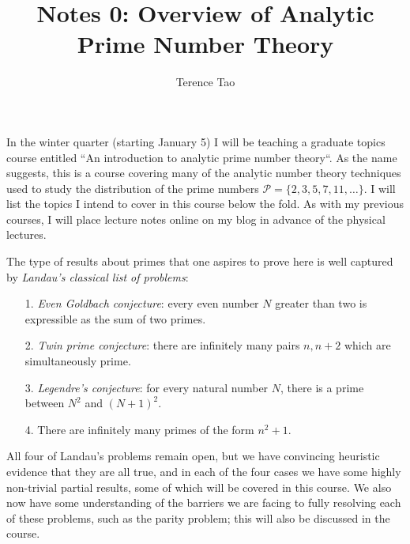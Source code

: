 \documentclass[10pt,reqno]{amsart}
\title{Notes 0: Overview of Analytic Prime Number Theory}
\author{Terence Tao}
\begin{document}
\maketitle

In the winter quarter (starting January 5) I will be teaching a graduate topics course entitled “An introduction to analytic prime number theory“. As the name suggests, this is a course covering many of the analytic number theory techniques used to study the distribution of the prime numbers ${{\mathcal P} = \{2,3,5,7,11,\dots\}}$. I will list the topics I intend to cover in this course below the fold. As with my previous courses, I will place lecture notes online on my blog in advance of the physical lectures.

The type of results about primes that one aspires to prove here is well captured by \emph{Landau’s classical list of problems}:
%
\begin{enumerate}
    \item[1.] \emph{Even Goldbach conjecture}: every even number ${N}$ greater than two is expressible as the sum of two primes.
    \item[2.] \emph{Twin prime conjecture}: there are infinitely many pairs ${n,n+2}$ which are simultaneously prime.
    \item[3.] \emph{Legendre’s conjecture}: for every natural number ${N}$, there is a prime between ${N^2}$ and ${(N+1)^2}$.
    \item[4.] There are infinitely many primes of the form ${n^2+1}$.
\end{enumerate}
%
All four of Landau’s problems remain open, but we have convincing heuristic evidence that they are all true, and in each of the four cases we have some highly non-trivial partial results, some of which will be covered in this course. We also now have some understanding of the barriers we are facing to fully resolving each of these problems, such as the parity problem; this will also be discussed in the course.
\end{document}
